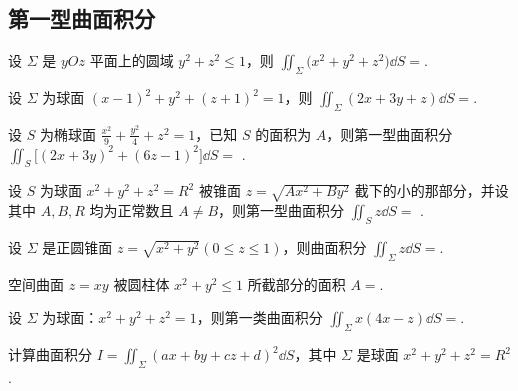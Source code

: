 \subsection{第一型曲面积分}

	\begin{ti}
		设 $\varSigma$ 是 $yOz$ 平面上的圆域 $y^{2} + z^{2} \leq 1$，则 $\iint_{\varSigma} \bigl( x^{2} + y^{2} + z^{2} \bigr) \dd{S} = $\kuo.

	\end{ti}

	\begin{ti}
		设 $\varSigma$ 为球面 $(x - 1)^{2} + y^{2} + (z + 1)^{2} = 1$，则 $\iint_{\varSigma} (2x + 3y + z) \dd{S} = $\kuo.
		
		\fourch{$4\uppi$}{$2\uppi$}{$\uppi$}{$0$}
	\end{ti}

	\begin{ti}
		设 $S$ 为椭球面 $\frac{x^{2}}{9} + \frac{y^{2}}{4} + z^{2} = 1$，已知 $S$ 的面积为 $A$，则第一型曲面积分 $\iint_{S} \bigl[ (2x + 3y)^{2} + (6z - 1)^{2} \bigr] \dd{S} = $ \htwo.
	\end{ti}

	\begin{ti}
		设 $S$ 为球面 $x^{2} + y^{2} + z^{2} = R^{2}$ 被锥面 $z = \sqrt{Ax^{2} + By^{2}}$ 截下的小的那部分，并设其中 $A, B, R$ 均为正常数且 $A \ne B$，则第一型曲面积分 $\iint_{S} z \dd{S} = $ \htwo.
	\end{ti}

	\begin{ti}
		设 $\varSigma$ 是正圆锥面 $z = \sqrt{x^{2} + y^{2}} (0 \leq z \leq 1)$，则曲面积分 $\iint_{\varSigma} z \dd{S} = $\kuo.

		\fourch{$\frac{2\sqrt{2}}{3}\uppi$}{$\frac{\sqrt{2}}{3}\uppi$}{$\sqrt{2}\uppi$}{$\uppi$}
	\end{ti}

	\begin{ti}
		空间曲面 $z = xy$ 被圆柱体 $x^{2} + y^{2} \leq 1$ 所截部分的面积 $A = $\htwo.
	\end{ti}

	\begin{ti}
		设 $\varSigma$ 为球面：$x^{2} + y^{2} + z^{2} = 1$，则第一类曲面积分 $\iint_{\varSigma} x (4x - z) \dd{S} = $\htwo.
	\end{ti}

	\begin{ti}
		计算曲面积分 $I = \iint_{\varSigma} (ax + by + cz + d)^{2} \dd{S}$，其中 $\varSigma$ 是球面 $x^{2} + y^{2} + z^{2} = R^{2}$.
	\end{ti}

